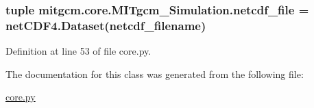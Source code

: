 \subsubsection[{netcdf\+\_\+file}]{\setlength{\rightskip}{0pt plus 5cm}tuple mitgcm.\+core.\+M\+I\+Tgcm\+\_\+\+Simulation.\+netcdf\+\_\+file = net\+C\+D\+F4.\+Dataset(netcdf\+\_\+filename)\hspace{0.3cm}{\ttfamily [static]}}\label{classmitgcm_1_1core_1_1MITgcm__Simulation_a801f2b7847cdd50c031f6f566e263189}


Definition at line 53 of file core.\+py.



The documentation for this class was generated from the following file\+:\begin{DoxyCompactItemize}
\item 
\hyperlink{core_8py}{core.\+py}\end{DoxyCompactItemize}
